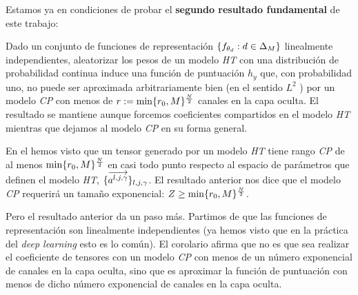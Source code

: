 Estamos ya en condiciones de probar el \textbf{segundo resultado fundamental} de este trabajo:

\begin{corolario} \label{corolario:corolario_principal_concreto}
    Dado un conjunto de funciones de representación $\{ f_{\theta_d}: d \in \Delta_{M} \}$ linealmente independientes, aleatorizar los pesos de un modelo \textit{HT} con una distribución de probabilidad continua induce una función de puntuación $h_y$ que, con probabilidad uno, no puede ser aproximada arbitrariamente bien (en el sentido $L^2$ ) por un modelo \textit{CP} con menos de $r := \min \{ r_0, M \}^{\frac{N}{2}}$ canales en la capa oculta. El resultado se mantiene aunque forcemos coeficientes compartidos en el modelo \textit{HT} mientras que dejamos al modelo \textit{CP} en su forma general.
\end{corolario}

\begin{observacion}
    En el  hemos visto que un tensor generado por un modelo \textit{HT} tiene rango \textit{CP} de al menos $\min \{ r_0, M \}^{\frac{N}{2}}$  en casi todo punto respecto al espacio de parámetros que definen el modelo \textit{HT}, $\{ \overrightarrow{a^{l, j, \gamma}} \}_{l, j, \gamma}$. El resultado anterior nos dice que el modelo \textit{CP} requerirá un tamaño exponencial: $Z \geq \min \{ r_0, M \}^{\frac{N}{2}}$.

    Pero el resultado anterior da un paso más. Partimos de que las funciones de representación son linealmente independientes (ya hemos visto que en la práctica del \textit{deep learning} esto es lo común). El corolario afirma que no es que sea  realizar el coeficiente de tensores con un modelo \textit{CP} con menos de un número exponencial de canales en la capa oculta, sino que es  aproximar la función de puntuación con menos de dicho número exponencial de canales en la capa oculta.
\end{observacion}

